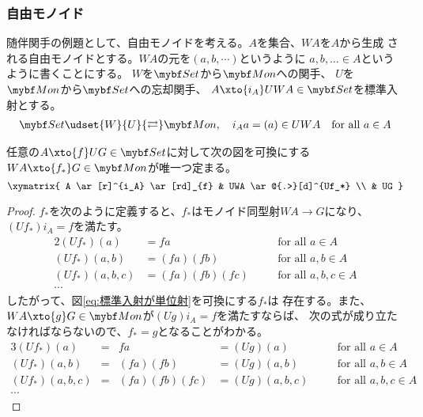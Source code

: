 {\subsubsection{自由モノイド}\label{s3:自由モノイド} %
	随伴関手の例題として、自由モノイドを考える。$A$を集合、$WA$を$A$から生成
	される自由モノイドとする。$WA$の元を$(a,b,\cdots)$というように
	$a,b,\dots\in A$というように書くことにする。
	$W$を$\catSet$から$\catMon$への関手、
	$U$を$\catMon$から$\catSet$への忘却関手、
	$A\xto{i_A}UWA\in\catSet$を標準入射とする。
	\begin{equation*}\begin{split}
		\catSet\udset{W}{U}{\rightleftarrows}\catMon,\quad
		i_Aa=(a)\in UWA \quad\text{for all }a\in A
	\end{split}\end{equation*}

	\begin{proposition}[自由モノイドの普遍性]\label{prop:自由モノイドの普遍性} %
		任意の$A\xto{f}UG\in\catSet$に対して次の図を可換にする
		$WA\xto{f_*}G\in\catMon$が唯一つ定まる。
		\begin{equation}\label{eq:標準入射が単位射}\xymatrix{
			A \ar[r]^{i_A} \ar[rd]_{f} & UWA \ar@{.>}[d]^{Uf_*} \\
			& UG
		}\end{equation}
	\end{proposition} %
	\begin{proof} %
		$f_*$を次のように定義すると、$f_*$はモノイド同型射$WA\to G$になり、
		$(Uf_*)i_A=f$を満たす。
		\begin{alignat*}{2}
			(Uf_*)(a) &= fa &\quad& \text{for all } a\in A \\
			(Uf_*)(a,b) &= (fa)(fb) &\quad& \text{for all } a,b\in A \\
			(Uf_*)(a,b,c) &= (fa)(fb)(fc) &\quad& \text{for all } a,b,c\in A \\
			\cdots
		\end{alignat*}
		したがって、図\eqref{eq:標準入射が単位射}を可換にする$f_*$は
		存在する。また、$WA\xto{g}G\in\catMon$が$(Ug)i_A=f$を満たすならば、
		次の式が成り立たなければならないので、$f_*=g$となることがわかる。
		\begin{alignat*}{3}
			(Uf_*)(a) &=& fa &= (Ug)(a) &\quad& \text{for all } a\in A \\
			(Uf_*)(a,b) &=& (fa)(fb) &= (Ug)(a,b)
				&\quad& \text{for all } a,b\in A \\
			(Uf_*)(a,b,c) &=& (fa)(fb)(fc) &= (Ug)(a,b,c) 
				&\quad& \text{for all } a,b,c\in A \\
			\cdots
		\end{alignat*}
	\end{proof} %

}

